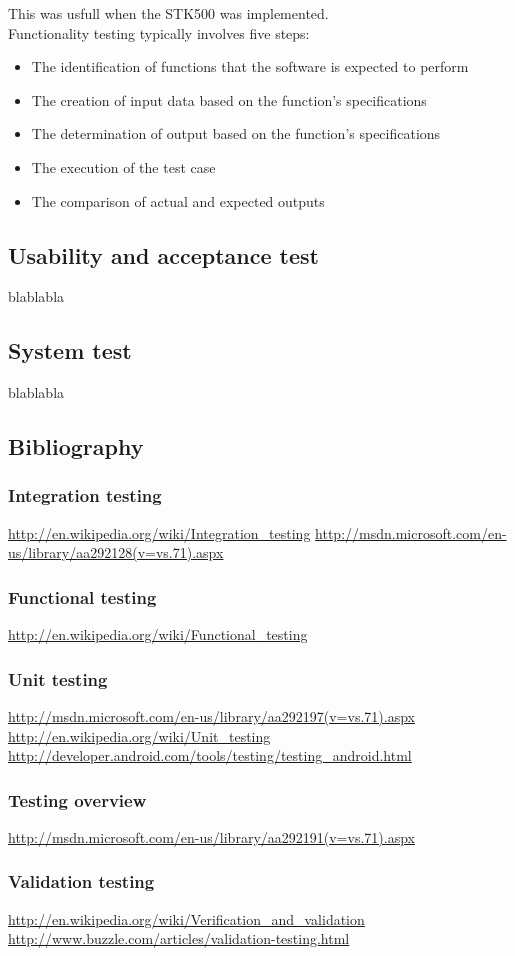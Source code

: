 			This was usfull when the STK500 was implemented.\\

			Functionality testing typically involves five steps:\\
			\begin{itemize}
			\item{The identification of functions that the software is expected to perform}
			\item{The creation of input data based on the function's specifications}
			\item{The determination of output based on the function's specifications}
			\item{The execution of the test case}
			\item{The comparison of actual and expected outputs}
			\end{itemize}

	\subsection{Usability and acceptance test}
		blablabla

	\subsection{System test}
		blablabla


\subsection{Bibliography}
	
	\subsubsection{Integration testing}
	\url{http://en.wikipedia.org/wiki/Integration_testing}
	\url{http://msdn.microsoft.com/en-us/library/aa292128(v=vs.71).aspx}

	\subsubsection{Functional testing}
	\url{http://en.wikipedia.org/wiki/Functional_testing}

	\subsubsection{Unit testing}
	\url{http://msdn.microsoft.com/en-us/library/aa292197(v=vs.71).aspx}
	\url{http://en.wikipedia.org/wiki/Unit_testing}
	\url{http://developer.android.com/tools/testing/testing_android.html}

	\subsubsection{Testing overview}
	\url{http://msdn.microsoft.com/en-us/library/aa292191(v=vs.71).aspx}

	\subsubsection{Validation testing}
	\url{http://en.wikipedia.org/wiki/Verification_and_validation}
	\url{http://www.buzzle.com/articles/validation-testing.html}